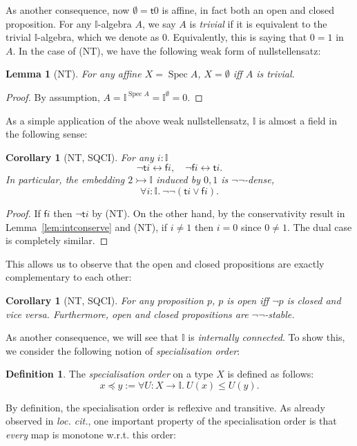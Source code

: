 \documentclass[12pt]{amsart}
\newtheorem{lemma}[theorem]{Lemma}
\newtheorem{corollary}[theorem]{Corollary}
\theoremstyle{definition}
\newtheorem{definition}[theorem]{Definition}
\newcommand{\mbb}[1]{\mathbb{#1}}
\newcommand{\I}{\mbb I}
\newcommand{\ms}[1]{\mathsf{#1}}
\newcommand{\inj}{\rightarrowtail}
\newcommand{\dneg}{\neg\neg}
\newcommand{\fa}[2]{\forall #1\!\colon\!\!#2.\ }
\newcommand{\emp}{\emptyset}
\newcommand{\eq}{\leftrightarrow}
\newcommand{\spec}{\operatorname{Spec}}
\begin{document}
As another consequence, now $\emp = \ms t0$ is affine, in fact both an open and closed proposition. For any $\I$-algebra $A$, we say $A$ is \emph{trivial} if it is equivalent to the trivial $\I$-algebra, which we denote as $0$. Equivalently, this is saying that $0 = 1$ in $A$. In the case of (NT), we have the following weak form of nullstellensatz:

\begin{lemma}[NT]\label{lem:nulls}
  For any affine $X = \spec A$, $X = \emp$ iff $A$ is trivial.
\end{lemma}
\begin{proof}
  By assumption, $A = \I^{\spec A} = \I^\emp = 0$. 
\end{proof}

As a simple application of the above weak nullstellensatz, $\I$ is almost a field in the following sense:

\begin{corollary}[NT, SQCI]\label{cor:field}
  For any $i : \I$ 
  \[ \neg \ms ti \eq \ms fi, \quad \neg\ms fi \eq \ms ti. \]
  In particular, the embedding $2 \inj \I$ induced by $0,1$ is $\neg\neg$-dense,
  \[ \fa i\I \dneg(\ms ti \vee \ms fi). \]
\end{corollary}
\begin{proof}
  If $\ms fi$ then $\neg\ms ti$ by (NT). On the other hand, by the conservativity result in Lemma~\ref{lem:intconserve} and (NT), if $i \neq 1$ then $i = 0$ since $0 \neq 1$. The dual case is completely similar. 
\end{proof}

This allows us to observe that the open and closed propositions are exactly complementary to each other:

\begin{corollary}[NT, SQCI]\label{cor:opendnegclose}
  For any proposition $p$, $p$ is open iff $\neg p$ is closed and vice versa. Furthermore, open and closed propositions are $\dneg$-stable.
\end{corollary}

As another consequence, we will see that $\I$ is \emph{internally connected}. To show this, we consider the following notion of \emph{specialisation order}:

\begin{definition}
  The \emph{specialisation order} on a type $X$ is defined as follows:
  \[ x \preceq y := \fa{U}{X\to\I} U(x) \le U(y). \]
\end{definition}

By definition, the specialisation order is reflexive and transitive. As already observed in \emph{loc. cit.}, one important property of the specialisation order is that \emph{every} map is monotone w.r.t. this order:
\end{document}
